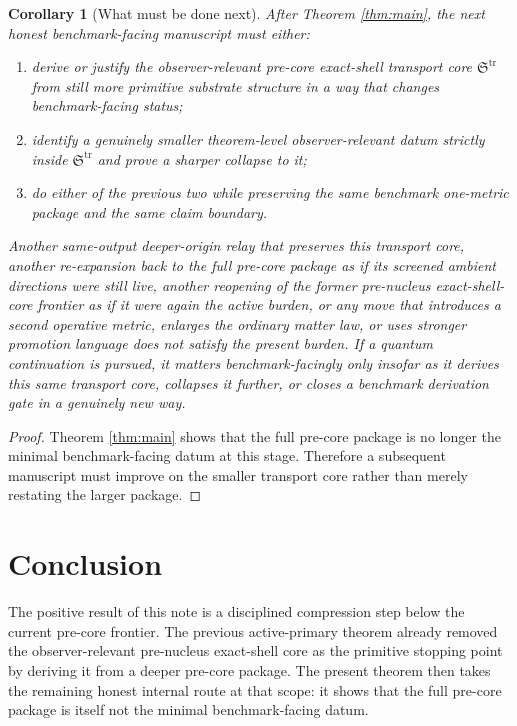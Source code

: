\documentclass[11pt]{article}
\newcommand{\PreCoreTransportCore}{\mathfrak S^{\mathrm{tr}}}
\newtheorem{corollary}{Corollary}
\begin{document}
\begin{corollary}[What must be done next]
\label{cor:next}
After Theorem \ref{thm:main}, the next honest benchmark-facing manuscript must either:
\begin{enumerate}
    \item derive or justify the observer-relevant pre-core exact-shell transport core \(\PreCoreTransportCore\) from still more primitive substrate structure in a way that changes benchmark-facing status;
    \item identify a genuinely smaller theorem-level observer-relevant datum strictly inside \(\PreCoreTransportCore\) and prove a sharper collapse to it;
    \item do either of the previous two while preserving the same benchmark one-metric package and the same claim boundary.
\end{enumerate}
Another same-output deeper-origin relay that preserves this transport core, another re-expansion back to the full pre-core package as if its screened ambient directions were still live, another reopening of the former pre-nucleus exact-shell-core frontier as if it were again the active burden, or any move that introduces a second operative metric, enlarges the ordinary matter law, or uses stronger promotion language does not satisfy the present burden. If a quantum continuation is pursued, it matters benchmark-facingly only insofar as it derives this same transport core, collapses it further, or closes a benchmark derivation gate in a genuinely new way.
\end{corollary}

\begin{proof}
Theorem \ref{thm:main} shows that the full pre-core package is no longer the minimal benchmark-facing datum at this stage. Therefore a subsequent manuscript must improve on the smaller transport core rather than merely restating the larger package.
\end{proof}

\section{Conclusion}

The positive result of this note is a disciplined compression step below the current pre-core frontier. The previous active-primary theorem already removed the observer-relevant pre-nucleus exact-shell core as the primitive stopping point by deriving it from a deeper pre-core package. The present theorem then takes the remaining honest internal route at that scope: it shows that the full pre-core package is itself not the minimal benchmark-facing datum.
\end{document}
